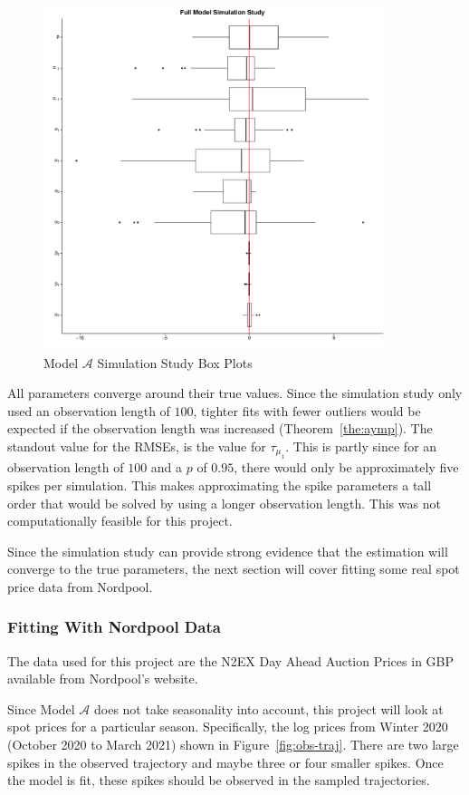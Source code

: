 \begin{figure}[H]
        \centering
        \includegraphics[width=10cm]{images/fitting/full_model/ss.pdf}
        \caption{Model $\mathcal{A}$ Simulation Study Box Plots}
        \label{fig:ss-full}
\end{figure}

All parameters converge around their true values. Since the simulation study only used an observation length of $100$, tighter fits with fewer outliers would be expected if the observation length was increased (Theorem~\ref{the:aymp}). The standout value for the RMSEs, is the value for $\tau_{\mu_1}$. This is partly since for an observation length of $100$ and a $p$ of $0.95$, there would only be approximately five spikes per simulation. This makes approximating the spike parameters a tall order that would be solved by using a longer observation length. This was not computationally feasible for this project.

Since the simulation study can provide strong evidence that the estimation will converge to the true parameters, the next section will cover fitting some real spot price data from Nordpool.

\subsubsection{Fitting With Nordpool Data}
\label{subsec:fit-real}

The data used for this project are the N2EX Day Ahead Auction Prices in GBP available from Nordpool's website.

Since Model $\mathcal{A}$ does not take seasonality into account, this project will look at spot prices for a particular season. Specifically, the log prices from Winter 2020 (October 2020 to March 2021) shown in Figure~\ref{fig:obs-traj}. There are two large spikes in the observed trajectory and maybe three or four smaller spikes. Once the model is fit, these spikes should be observed in the sampled trajectories.

